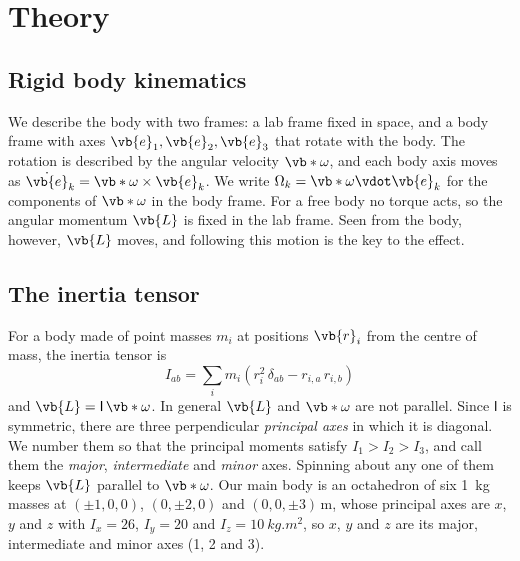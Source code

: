 \section{Theory}
\label{sec:theory}

\subsection{Rigid body kinematics}
\label{sec:kinematics}
We describe the body with two frames: a lab frame fixed in space, and a body frame with axes $\vb{e}_1,\vb{e}_2,\vb{e}_3$ that rotate with the body.
The rotation is described by the angular velocity $\vb*{\omega}$, and each body axis moves as $\dot{\vb{e}}_k=\vb*{\omega}\times\vb{e}_k$.
We write $\Omega_k=\vb*{\omega}\vdot\vb{e}_k$ for the components of $\vb*{\omega}$ in the body frame.
For a free body no torque acts, so the angular momentum $\vb{L}$ is fixed in the lab frame.
Seen from the body, however, $\vb{L}$ moves, and following this motion is the key to the effect.

\subsection{The inertia tensor}
\label{sec:inertia}
For a body made of point masses $m_i$ at positions $\vb{r}_i$ from the centre of mass, the inertia tensor is
\begin{equation}
    I_{ab} = \sum_i m_i\left(r_i^2\,\delta_{ab} - r_{i,a}\,r_{i,b}\right)
    \label{eq:inertia}
\end{equation}
and $\vb{L}=\mathsf{I}\,\vb*{\omega}$.
In general $\vb{L}$ and $\vb*{\omega}$ are not parallel.
Since $\mathsf{I}$ is symmetric, there are three perpendicular \emph{principal axes} in which it is diagonal.
We number them so that the principal moments satisfy $I_1>I_2>I_3$, and call them the \emph{major}, \emph{intermediate} and \emph{minor} axes.
Spinning about any one of them keeps $\vb{L}$ parallel to $\vb*{\omega}$.
Our main body is an octahedron of six \SI{1}{kg} masses at $(\pm1,0,0)$, $(0,\pm2,0)$ and $(0,0,\pm3)$\,m, whose principal axes are $x$, $y$ and $z$ with $I_x=26$, $I_y=20$ and $I_z=\SI{10}{kg.m^2}$, so $x$, $y$ and $z$ are its major, intermediate and minor axes (1, 2 and 3).

